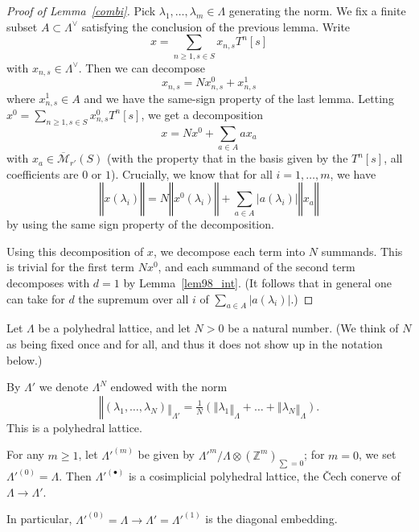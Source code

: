 \begin{proof}[{Proof of Lemma~\ref{combi}}]
  \leanok
  Pick $\lambda_1,\ldots,\lambda_m\in \Lambda$ generating the norm. We fix a finite subset $A\subset \Lambda^\vee$ satisfying the conclusion of the previous lemma. Write
  \[
  x=\sum_{n\geq 1, s\in S} x_{n,s} T^n [s]
  \]
  with $x_{n,s}\in \Lambda^\vee$. Then we can decompose
  \[
  x_{n,s} = N x_{n,s}^0 + x_{n,s}^1
  \]
  where $x_{n,s}^1\in A$ and we have the same-sign property of the last lemma. Letting $x^0 = \sum_{n\geq 1, s\in S} x_{n,s}^0 T^n [s]$, we get a decomposition
  \[
  x = Nx^0 + \sum_{a\in A} a x_a
  \]
  with $x_a\in \overline{\mathcal M}_{r'}(S)$ (with the property that in the
  basis given by the $T^n [s]$, all coefficients are $0$ or $1$). Crucially,
  we know that for all $i=1,\ldots,m$, we have
  \[
  ‖x(\lambda_i)‖ = N ‖x^0(\lambda_i)‖ + \sum_{a\in A} |a(\lambda_i)| ‖x_a‖
  \]
  by using the same sign property of the decomposition.

  Using this decomposition of $x$, we decompose each term into $N$ summands.
  This is trivial for the first term $Nx^0$,
  and each summand of the second term decomposes with $d = 1$ by Lemma~\ref{lem98_int}.
  (It follows that in general one can take for $d$
  the supremum over all $i$ of $\sum_{a\in A} |a(\lambda_i)|$.)
\end{proof}

\begin{definition}
  \label{rescaled-sum}
  Let $\Lambda$ be a polyhedral lattice, and let $N > 0$ be a natural number.
  (We think of $N$ as being fixed once and for all,
  and thus it does not show up in the notation below.)

  By $\Lambda'$ we denote $\Lambda^N$ endowed with the norm
  \[
	  ‖(\lambda_1,\ldots,\lambda_N)‖_{\Lambda'} = \tfrac 1N(‖\lambda_1‖_\Lambda+\ldots+‖\lambda_N‖_\Lambda).
  \]
  This is a polyhedral lattice.
\end{definition}

\begin{definition}
  \label{cosimplicial-lattice}
  For any $m\geq 1$, let $\Lambda'^{(m)}$ be given by $\Lambda'^m / \Lambda\otimes (\mathbb Z^m)_{\sum=0}$;
  for $m=0$, we set $\Lambda'^{(0)} = \Lambda$.
  Then $\Lambda'^{(\bullet)}$ is a cosimplicial polyhedral lattice,
  the \v{C}ech conerve of $\Lambda\to \Lambda'$.

  In particular, $\Lambda'^{(0)} = \Lambda \to \Lambda' = \Lambda'^{(1)}$
  is the diagonal embedding.
\end{definition}


